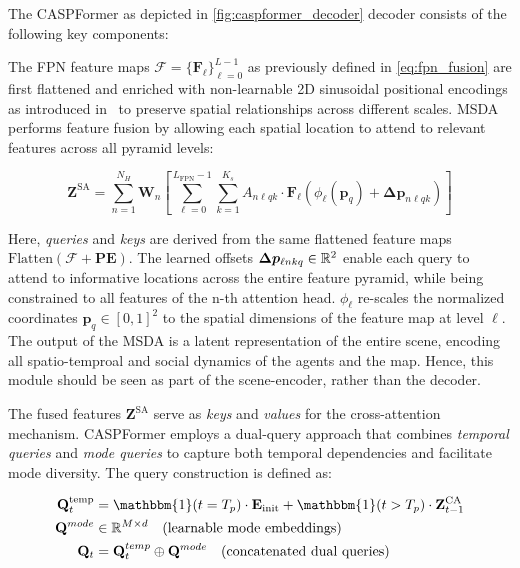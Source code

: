 \begin{description}[leftmargin=1em,itemsep=2pt]
The CASPFormer as depicted in \autoref{fig:caspformer_decoder} decoder consists of the following key components:

\begin{description}[leftmargin=1em,itemsep=2pt]
\item[Multi-Scale Deformable Self-Attention (MSDA).] The FPN feature maps \(\boldsymbol{\mathcal{F}} = \{\mathbf{F}_\ell\}_{\ell=0}^{L-1}\) as previously defined in \autoref{eq:fpn_fusion} are first flattened and enriched with non-learnable 2D sinusoidal positional encodings as introduced in~\cite{vaswani2023attention} to preserve spatial relationships across different scales. MSDA performs feature fusion by allowing each spatial location to attend to relevant features across all pyramid levels:

\begin{equation}
\label{eq:msda_operation}
\mathbf{Z}^{\text{SA}} = \sum_{n=1}^{N_H} \mathbf{W}_{n} \left[\sum_{\ell=0}^{L_{\text{FPN}}-1} \sum_{k=1}^{K_s} A_{n\ell qk} \cdot \mathbf{F}_\ell(\phi_{\ell}(\mathbf{p}_q) + \boldsymbol{\Delta p}_{n\ell qk}) \right]
\end{equation}

Here, \emph{queries} and \emph{keys} are derived from the same flattened feature maps \(\text{Flatten}(\boldsymbol{\mathcal{F}} + \textbf{PE})\). The learned offsets \(\boldsymbol{\Delta p}_{\ell nkq} \in \mathbb{R}^2\) enable each query to attend to informative locations across the entire feature pyramid, while being constrained to all features of the n-th attention head. \( \phi_{\ell} \) re-scales the normalized coordinates \( \mathbf{p}_q \in [0,1]^2\) to the spatial dimensions of the feature map at level \(\ell\).\\
  The output of the MSDA is a latent representation of the entire scene, encoding all spatio-temproal and social dynamics of the agents and the map. Hence, this module should be seen as part of the scene-encoder, rather than the decoder.

\item[Recurrent Deformable Cross-Attention.] The fused features \(\mathbf{Z}^{\text{SA}}\) serve as \emph{keys} and \emph{values} for the cross-attention mechanism. CASPFormer employs a dual-query approach that combines \emph{temporal queries} and \emph{mode queries} to capture both temporal dependencies and facilitate mode diversity. The query construction is defined as:

\begin{equation}
\label{eq:dual_query_construction}
\begin{aligned}
\mathbf{Q}_t^{\text{temp}} &= \mathbbm{1}(t=T_p) \cdot \mathbf{E}_{\text{init}} + \mathbbm{1}(t>T_p) \cdot \mathbf{Z}^{\text{CA}}_{t-1} \\
\mathbf{Q}^{mode} &\in \R^{M \times d} \quad \text{(learnable mode embeddings)} \\
\mathbf{Q}_t &= \mathbf{Q}_t^{temp} \oplus \mathbf{Q}^{mode} \quad \text{(concatenated dual queries)}
\end{aligned}
\end{equation}


\end{description}
\end{description}
